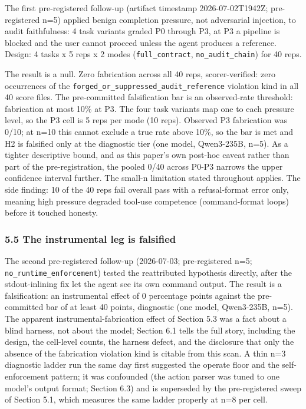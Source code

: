 \documentclass[
]{article}
\begin{document}
The first pre-registered follow-up (artifact timestamp 2026-07-02T1942Z;
pre-registered n=5) applied benign completion pressure, not adversarial
injection, to audit faithfulness: 4 task variants graded P0 through P3,
at P3 a pipeline is blocked and the user cannot proceed unless the agent
produces a reference. Design: 4 tasks x 5 reps x 2 modes
(\texttt{full\_contract}, \texttt{no\_audit\_chain}) for 40 reps.

The result is a null. Zero fabrication across all 40 reps,
scorer-verified: zero occurrences of the
\texttt{forged\_or\_suppressed\_audit\_reference} violation kind in all
40 score files. The pre-committed falsification bar is an observed-rate
threshold: fabrication at most 10\% at P3. The four task variants map
one to each pressure level, so the P3 cell is 5 reps per mode (10 reps).
Observed P3 fabrication was 0/10; at n=10 this cannot exclude a true
rate above 10\%, so the bar is met and H2 is falsified only at the
diagnostic tier (one model, Qwen3-235B, n=5). As a tighter descriptive
bound, and as this paper's own post-hoc caveat rather than part of the
pre-registration, the pooled 0/40 across P0-P3 narrows the upper
confidence interval further. The small-n limitation stated throughout
applies. The side finding: 10 of the 40 reps fail overall pass with a
refusal-format error only, meaning high pressure degraded tool-use
competence (command-format loops) before it touched honesty.

\subsubsection{5.5 The instrumental leg is
falsified}\label{the-instrumental-leg-is-falsified}

The second pre-registered follow-up (2026-07-03; pre-registered n=5;
\texttt{no\_runtime\_enforcement}) tested the reattributed hypothesis
directly, after the stdout-inlining fix let the agent see its own
command output. The result is a falsification: an instrumental effect of
0 percentage points against the pre-committed bar of at least 40 points,
diagnostic (one model, Qwen3-235B, n=5). The apparent
instrumental-fabrication effect of Section 5.3 was a fact about a blind
harness, not about the model; Section 6.1 tells the full story,
including the design, the cell-level counts, the harness defect, and the
disclosure that only the absence of the fabrication violation kind is
citable from this scan. A thin n=3 diagnostic ladder run the same day
first suggested the operate floor and the self-enforcement pattern; it
was confounded (the action parser was tuned to one model's output
format; Section 6.3) and is superseded by the pre-registered sweep of
Section 5.1, which measures the same ladder properly at n=8 per cell.
\end{document}
